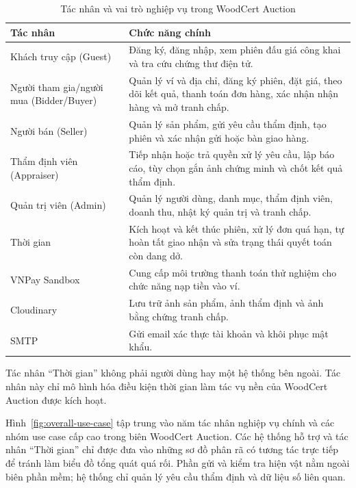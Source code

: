 \documentclass[../DoAn.tex]{subfiles}
\begin{document}
\begin{table}[htbp]
    \centering
    \caption{Tác nhân và vai trò nghiệp vụ trong WoodCert Auction}
    \label{tab:actor-main-functions}
    \footnotesize
    \setlength{\tabcolsep}{4pt}
    \renewcommand{\arraystretch}{1.05}
    \begin{tabular}{|>{\raggedright\arraybackslash}p{}|>{\raggedright\arraybackslash}p{}|}
        \hline
        \textbf{Tác nhân} & \textbf{Chức năng chính} \\
        \hline
        Khách truy cập (Guest) & Đăng ký, đăng nhập, xem phiên đấu giá công khai và tra cứu chứng thư điện tử. \\
        \hline
        Người tham gia/người mua (Bidder/Buyer) & Quản lý ví và địa chỉ, đăng ký phiên, đặt giá, theo dõi kết quả, thanh toán đơn hàng, xác nhận nhận hàng và mở tranh chấp. \\
        \hline
        Người bán (Seller) & Quản lý sản phẩm, gửi yêu cầu thẩm định, tạo phiên và xác nhận gửi hoặc bàn giao hàng. \\
        \hline
        Thẩm định viên (Appraiser) & Tiếp nhận hoặc trả quyền xử lý yêu cầu, lập báo cáo, tùy chọn gắn ảnh chứng minh và chốt kết quả thẩm định. \\
        \hline
        Quản trị viên (Admin) & Quản lý người dùng, danh mục, thẩm định viên, doanh thu, nhật ký quản trị và tranh chấp. \\
        \hline
        Thời gian & Kích hoạt và kết thúc phiên, xử lý đơn quá hạn, tự hoàn tất giao nhận và sửa trạng thái quyết toán còn dang dở. \\
        \hline
        VNPay Sandbox & Cung cấp môi trường thanh toán thử nghiệm cho chức năng nạp tiền vào ví. \\
        \hline
        Cloudinary & Lưu trữ ảnh sản phẩm, ảnh thẩm định và ảnh bằng chứng tranh chấp. \\
        \hline
        SMTP & Gửi email xác thực tài khoản và khôi phục mật khẩu. \\
        \hline
    \end{tabular}
\end{table}

Tác nhân ``Thời gian'' không phải người dùng hay một hệ thống bên ngoài. Tác nhân này chỉ mô hình hóa điều kiện thời gian làm tác vụ nền của WoodCert Auction được kích hoạt.

Hình~\ref{fig:overall-use-case} tập trung vào năm tác nhân nghiệp vụ chính và các nhóm use case cấp cao trong biên WoodCert Auction. Các hệ thống hỗ trợ và tác nhân ``Thời gian'' chỉ được đưa vào những sơ đồ phân rã có tương tác trực tiếp để tránh làm biểu đồ tổng quát quá rối. Phần gửi và kiểm tra hiện vật nằm ngoài biên phần mềm; hệ thống chỉ quản lý yêu cầu thẩm định và dữ liệu số liên quan.
\end{document}

